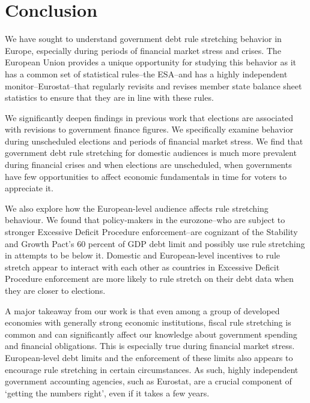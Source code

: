 \documentclass[]{article}
\begin{document}
\section{Conclusion}

We have sought to understand government debt rule stretching behavior in Europe, especially during periods of financial market stress and crises. The European Union provides a unique opportunity for studying this behavior as it has a common set of statistical rules--the ESA--and has a highly independent monitor--Eurostat--that regularly revisits and revises member state balance sheet statistics to ensure that they are in line with these rules.

We significantly deepen findings in previous work that elections are associated with revisions to government finance figures. We specifically examine behavior during unscheduled elections and periods of financial market stress. We find that government debt rule stretching for domestic audiences is much more prevalent during financial crises and when elections are unscheduled, when governments have few opportunities to affect economic fundamentals in time for voters to appreciate it.

We also explore how the European-level audience affects rule stretching behaviour. We found that policy-makers in the eurozone--who are subject to stronger Excessive Deficit Procedure enforcement--are cognizant of the Stability and Growth Pact's 60 percent of GDP debt limit and possibly use rule stretching in attempts to be below it. Domestic and European-level incentives to rule stretch appear to interact with each other as countries in Excessive Deficit Procedure enforcement are more likely to rule stretch on their debt data when they are closer to elections.

A major takeaway from our work is that even among a group of developed economies with generally strong economic institutions, fiscal rule stretching is common and can significantly affect our knowledge about government spending and financial obligations. This is especially true during financial market stress. European-level debt limits and the enforcement of these limits also appears to encourage rule stretching in certain circumstances. As such, highly independent government accounting agencies, such as Eurostat, are a crucial component of `getting the numbers right', even if it takes a few years.




\pagebreak
\renewcommand{\thepage}{A-\arabic{page}}\setcounter{page}{1}
\renewcommand{\thesection}{Appendix \arabic{section}}\setcounter{section}{0}
\renewcommand{\thetable}{A-\arabic{table}}\setcounter{table}{0}
\renewcommand{\thefigure}{A-\arabic{figure}}\setcounter{figure}{0}
\clearpage
\end{document}
